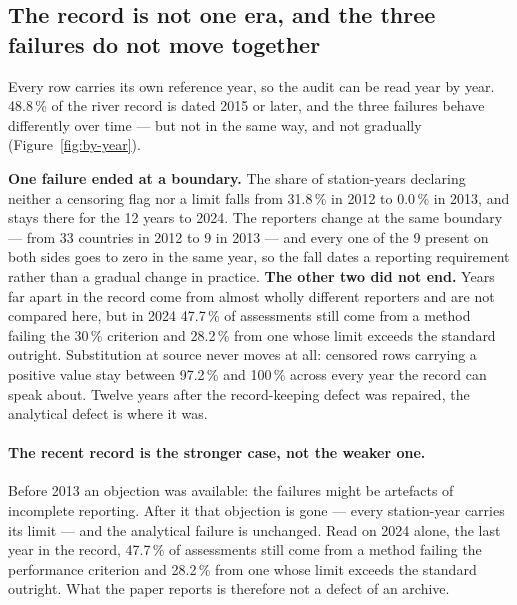\subsection{The record is not one era, and the three failures do not move together}
\label{sec:results-era}
Every row carries its own reference year, so the audit can be read year by
year. \num{48.8}\,\% of the river
record is dated \num{2015} or later, and the three failures behave differently
over time --- but not in the same way, and not gradually
(Figure~\ref{fig:by-year}).

\textbf{One failure ended at a boundary.} The share of station-years
declaring neither a censoring flag nor a limit falls from \num{31.8}\,\% in
\num{2012} to \num{0.0}\,\% in \num{2013}, and stays there for the
\num{12} years to \num{2024}. The reporters change at the same boundary --- from
\num{33} countries in \num{2012} to \num{9} in \num{2013} --- and every one of the
\num{9} present on both sides goes to zero in the same year, so the fall dates a
reporting requirement rather than a gradual change in
practice. \textbf{The other two did
not end.} Years far apart in the record come from almost wholly different
reporters and are not compared here, but in \num{2024} \num{47.7}\,\% of
assessments still come from a method failing the \num{30}\,\% criterion and
\num{28.2}\,\% from one whose limit exceeds the standard outright. Substitution at source never moves at all: censored rows
carrying a positive value stay between \num{97.2}\,\% and \num{100}\,\%
across every year the record can speak about. Twelve years after the
record-keeping defect was repaired, the analytical defect is where it was.

\paragraph{The recent record is the stronger case, not the weaker one.} Before
\num{2013} an objection was available: the failures might be artefacts of
incomplete reporting. After it that objection is gone --- every station-year
carries its limit --- and the analytical failure is unchanged. Read on
\num{2024} alone, the last year in the record, \num{47.7}\,\% of assessments
still come from a method failing the performance criterion and \num{28.2}\,\%
from one whose limit exceeds the standard outright. What the paper reports is
therefore not a defect of an archive.

